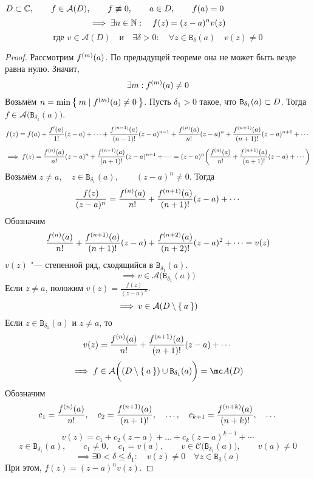 \begin{theorem}
	$ D \sub \Co, \qquad f \in \mathcal A(D), \qquad f \not\equiv 0, \qquad a \in D, \qquad f(a) = 0 $
	$$ \implies \exists n \in \N : \quad f(z) = (z - a)^n v(z) $$
	$$ \text{где } v \in \mathcal A(D) \quad \text{и} \quad \exists \delta > 0 : \quad \forall z \in \mathtt B_\delta(a) \quad v(z) \ne 0 $$
\end{theorem}

\begin{proof}
	Рассмотрим $ \nder[m]f(a) $. По предыдущей теореме она не может быть везде равна нулю. Значит,
	$$ \exists m : \nder[m]f(a) \ne 0 $$
	Возьмём $ n = \min \set{m \mid \nder[m]f(a) \ne 0} $. Пусть $ \delta_1 > 0 $ такое, что $ \mathtt B_{\delta_1}(a) \sub D $. Тогда $ f \in \mathcal A \big( \mathtt B_{\delta_1}(a) \big) $.
	$$ f(z) = f(a) + \frac{f'(a)}{1!}(z - a) + \dots + \frac{\nder[n - 1]f(a)}{(n - 1)!}(z - a)^{n - 1} + \frac{\nder f(a)}{n!}(z - a)^n + \frac{\nder[n + 1]f(a)}{(n + 1)!}(z - a)^{n + 1} + \cdots $$
	$$ \implies f(z) = \frac{\nder f(a)}{n!}(z - a)^n + \frac{\nder[n + 1]f(a)}{(n + 1)!}(z - a)^{n + 1} + \cdots = (z - a)^n \bigg( \frac{\nder f(a)}{n!} + \frac{\nder[n + 1]f(a)}{(n + 1)!}(z - a) + \cdots \bigg) $$
	Возьмём $ z \ne a, \quad z \in \mathtt B_{\delta_1}(a), \qquad (z - a)^n \ne 0 $. Тогда
	$$ \frac{f(z)}{(z - a)^n} = \frac{\nder f(a)}{n!} + \frac{\nder[n + 1]f(a)}{(n + 1)!}(z - a) + \cdots $$
	Обозначим
	$$ \frac{\nder f(a)}{n!} + \frac{\nder[n + 1]f(a)}{(n + 1)!}(z - a) + \frac{\nder[n + 2]f(a)}{(n + 2)!}(z - a)^2 + \dots = v(z) $$
	$ v(z) $ "--- степенной ряд, сходящийся в $ \mathtt B_{\delta_1}(a) $.
	$$ \implies v \in \mathcal A \big( \mathtt B_{\delta_1}(a) \big) $$
	Если $ z \ne a $, положим $ v(z) = \frac{f(z)}{(z - a)^n} $.
	$$ \implies v \in \mathcal A(D \setminus \set a) $$
	Если $ z \in \mathtt B_{\delta_1}(a) $ и $ z \ne a $, то
	$$ v(z) = \frac{\nder f(a)}{n!} + \frac{\nder[n + 1]f(a)}{(n + 1)!}(z - a) + \cdots $$
	$$ \implies f \in \mathcal A \bigg( (D \setminus \set a) \cup \mathtt B_{\delta_1}(a) \bigg) = \mc A(D) $$
	Обозначим
	$$ c_1 = \frac{\nder f(a)}{n!}, \quad c_2 = \frac{\nder[n + 1]f(a)}{(n + 1)!}, \quad \dots, \quad c_{k + 1} = \frac{\nder[n + k]f(a)}{(n + k)!}, \quad \dots $$
	$$ v(z) = c_1 + c_2(z - a) + \dots + c_k(z - a)^{k - 1} + \cdots $$
	$$ z \in \mathtt B_{\delta_1}(a), \qquad c_1 \ne 0, \quad c_1 = v(a), \qquad v \in \mathcal C \big( \mathtt B_{\delta_1}(a) \big), \qquad v(a) \ne 0 $$
	$$ \implies \exists 0 < \delta \le \delta_1 : \quad v(z) \ne 0 \quad \forall z \in \mathtt B_\delta(a) $$
	При этом, $ f(z) = (z - a)^nv(z) $.
\end{proof}

